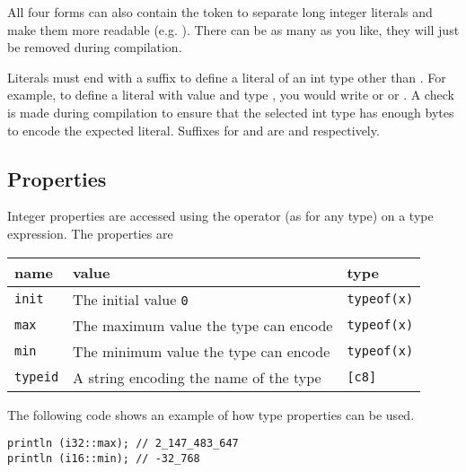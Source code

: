 All four forms can also contain the token \token{\_} to separate long integer
literals and make them more readable (e.g. ).
There can be as many \token{\_} as you like, they will just be removed during
compilation.

Literals must end with a suffix to define a literal of an int type other than
. For example, to define a literal with value  and type
, you would write  or  or
. A check is made during compilation to ensure that the selected
int type has enough bytes to encode the expected literal. Suffixes for
 and  are  and  respectively.

\subsection{Properties}
\label{sec:orgc02cb40}

Integer properties are accessed using the \token{::} operator (as for any type)
on a type expression. The properties are

\begin{center}
  \begin{adjustbox}{max width=\linewidth}
    \begin{tabular}{|l|ll|}
      \hline
      name & value & type\\[0pt]
      \hline
      \hline
      \texttt{init} & The initial value \texttt{0} & \texttt{typeof(x)}\\[0pt]
      \texttt{max} & The maximum value the type can encode & \texttt{typeof(x)}\\[0pt]
      \texttt{min} & The minimum value the type can encode & \texttt{typeof(x)}\\[0pt]
      \hline
      \texttt{typeid} & A string encoding the name of the type & \texttt{[c8]}\\[0pt]
      \hline
    \end{tabular}
  \end{adjustbox}
\end{center}



The following code shows an example of how type properties can be used.

\begin{lstlisting}[style=coloredverbatim]
println (i32::max); // 2_147_483_647
println (i16::min); // -32_768
\end{lstlisting}

